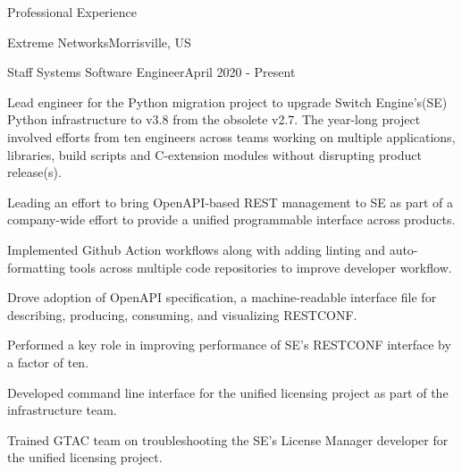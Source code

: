 \documentclass{resume} %
\begin{document}
\begin{rSection}{Professional Experience}
\begin{rSubsectionCompany}{Extreme Networks}{Morrisville, US}
\begin{comment}
                \item Worked in the Platform Independent team of EXOS - Extreme Networks' Network Operating System for Campus and Edge switching platform. Responsibilities included feature implementation, enhancement, maintenance and developer support across multiple EXOS modules.
                \item Core developer of the configuration manager module - a central piece of EXOS. Some of the major work included - configuration save optimization, configuration diff, MLAG orchestration mode, enhanced debug support to triage issues in the field and improve response time to code fix, enhance CLI commands and simplify CLI commands across different switch modes, SNMP response time during a configuration save.
                \item Other tasks: development of RESTCONF interfaces, fixing broken windows - coverity issues, help triage and resolve issues with peers, take part in formal and informal code reviews and discussions.
            \end{comment}
            \begin{rSubsectionCompanyRole}{Staff Systems Software Engineer}{April 2020 - Present}
                \item Lead engineer for the Python migration project to upgrade Switch Engine's(SE) Python infrastructure to v3.8 from the obsolete v2.7. The year-long project involved efforts from ten engineers across teams working on multiple applications, libraries, build scripts and C-extension modules without disrupting product release(s).
                \item Leading an effort to bring OpenAPI-based REST management to SE as part of a company-wide effort to provide a unified programmable interface across products.
                \item Implemented Github Action workflows along with adding linting and auto-formatting tools across multiple code repositories to improve developer workflow.
                \item Drove adoption of OpenAPI specification, a machine-readable interface file for describing, producing, consuming, and visualizing RESTCONF.
                \item Performed a key role in improving performance of SE's RESTCONF interface by a factor of ten.
                \item Developed command line interface for the unified licensing project as part of the infrastructure team.
                \item Trained GTAC team on troubleshooting the SE's License Manager developer for the unified licensing project.
            \end{rSubsectionCompanyRole}
    

\end{rSubsectionCompany}
\end{rSection}
\end{document}
